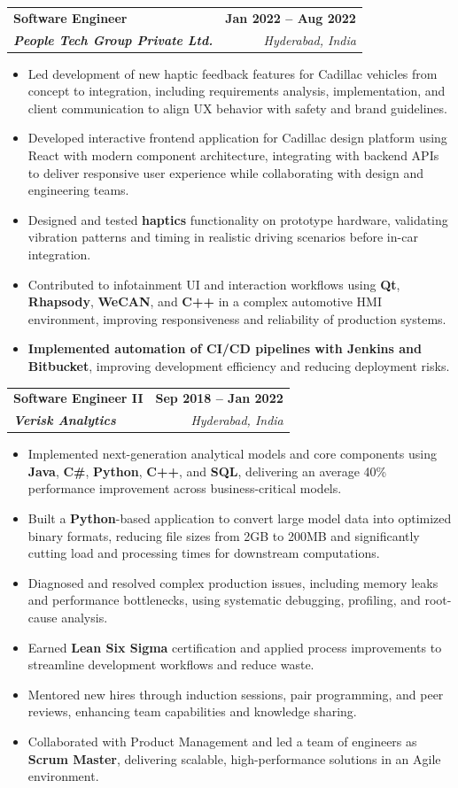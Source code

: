 \documentclass[letterpaper,11pt]{article}
\makeatletter
\newcommand{\resumeItem}[1]{
  \item\small{
    {#1 \vspace{-2pt}}
  }
}
\newcommand{\resumeSubheading}[4]{
  \vspace{-2pt}\item
    \begin{tabular*}{1.0\textwidth}[t]{l@{\extracolsep{\fill}}r}
      \textbf{#1} & \textbf{\small #2} \\
      \textit{\small#3} & \textit{\small #4} \\
    \end{tabular*}\vspace{-7pt}
}
\newcommand{\resumeItemListStart}{\begin{itemize}}
\newcommand{\resumeItemListEnd}{\end{itemize}\vspace{-5pt}}
\makeatother
\begin{document}
    \resumeSubheading
      {\textbf{Software Engineer}}{\textbf{Jan 2022 -- Aug 2022}}
      {\textbf{People Tech Group Private Ltd.}}{Hyderabad, India}
      \resumeItemListStart
        \resumeItem{Led development of new haptic feedback features for Cadillac vehicles from concept to integration, including requirements analysis, implementation, and client communication to align UX behavior with safety and brand guidelines.}
        \resumeItem{Developed interactive frontend application for Cadillac design platform using React with modern component architecture, integrating with backend APIs to deliver responsive user experience while collaborating with design and engineering teams.}
        \resumeItem{Designed and tested \textbf{haptics} functionality on prototype hardware, validating vibration patterns and timing in realistic driving scenarios before in-car integration.}
        \resumeItem{Contributed to infotainment UI and interaction workflows using \textbf{Qt}, \textbf{Rhapsody}, \textbf{WeCAN}, and \textbf{C++} in a complex automotive HMI environment, improving responsiveness and reliability of production systems.}
        \resumeItem{\textbf{Implemented automation of CI/CD pipelines with \textbf{Jenkins} and Bitbucket}, improving development efficiency and reducing deployment risks.}
      \resumeItemListEnd

    \resumeSubheading
      {\textbf{Software Engineer II}}{\textbf{Sep 2018 -- Jan 2022}}
      {\textbf{Verisk Analytics}}{Hyderabad, India}
      \resumeItemListStart
        \resumeItem{Implemented next-generation analytical models and core components using \textbf{Java}, \textbf{C\#}, \textbf{Python}, \textbf{C++}, and \textbf{SQL}, delivering an average 40\% performance improvement across business-critical models.}
        \resumeItem{Built a \textbf{Python}-based application to convert large model data into optimized binary formats, reducing file sizes from 2GB to 200MB and significantly cutting load and processing times for downstream computations.}
        \resumeItem{Diagnosed and resolved complex production issues, including memory leaks and performance bottlenecks, using systematic debugging, profiling, and root-cause analysis.}
        \resumeItem{Earned \textbf{Lean Six Sigma} certification and applied process improvements to streamline development workflows and reduce waste.}
        \resumeItem{Mentored new hires through induction sessions, pair programming, and peer reviews, enhancing team capabilities and knowledge sharing.}
        \resumeItem{Collaborated with Product Management and led a team of engineers as \textbf{Scrum Master}, delivering scalable, high-performance solutions in an Agile environment.}
      \resumeItemListEnd
\end{document}

